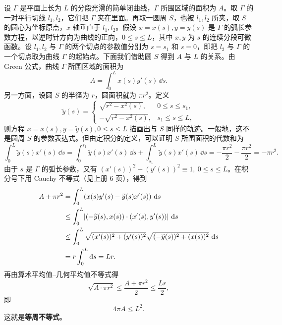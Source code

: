设 $\Gamma$ 是平面上长为 $L$ 的分段光滑的简单闭曲线，$\Gamma$ 所围区域的面积为 $A$。取 $\Gamma$ 的一对平行切线 $l_1,l_2$，它们把 $\Gamma$ 夹在里面。再取一圆周 $S$，也被 $l_1,l_2$ 所夹，取 $S$ 的圆心为坐标原点，$x$ 轴垂直于 $l_1,l_2$。假设 $x=x(s),y=y(s)$ 是 $\Gamma$ 的弧长参数方程，以逆时针方向为曲线的正向，$0\le s\le L$，其中 $x,y$ 为 $s$ 的连续分段可微函数。设 $l_1,l_2$ 与 $\Gamma$ 的两个切点的参数值分别为 $s=s_1$ 和 $s=0$，即把 $l_2$ 与 $\Gamma$ 的一个切点取为曲线 $\Gamma$ 的起始点。下面我们借助圆 $S$ 得到 $A$ 与 $L$ 的关系。由 Green 公式，曲线 $\Gamma$ 所围区域的面积为
\[
  A=\int_0^Lx(s)y'(s)\,\dd s.
\]
另一方面，设圆 $S$ 的半径为 $r$，圆面积就为 $\pi r^2$。定义
\[
  \widetilde y(s)=
  \begin{cases}
    \sqrt{r^2-x^2(s)},&0\le s\le s_1,\\
    -\sqrt{r^2-x^2(s)},&s_1\le s\le L,
  \end{cases}
\]
则方程 $x=x(s),y=\widetilde y(s),0\le s\le L$ 描画出与 $S$ 同样的轨迹。一般地，这不是圆周 $S$ 的参数表达式。但由定积分的定义，可以证明 $S$ 所围面积的代数和为
\[
  \int_0^L\widetilde y(s)x'(s)\,\dd s
  =\int_0^{s_1}\widetilde y(s)x'(s)\,\dd s+\int_{s_1}^L\widetilde y(s)x'(s)\,\dd s
  =-\frac{\pi r^2}{2}-\frac{\pi r^2}{2}=-\pi r^2.
\]
由于 $s$ 是 $\Gamma$ 的弧长参数，又有 $(x'(s))^2+(y'(s))^2\equiv1,\ 0\le s\le L$。在积分号下用 Cauchy 不等式（见上册 6 页），得到
\begin{align*}
  A+\pi r^2
  &=\int_0^L(x(s)y'(s)-\widetilde y(s)x'(s))\,\mathop{}\!\mathrm{d} s\\
  &\le\int_0^L\lvert(-\widetilde y(s),x(s))\cdot(x'(s),y'(s))\rvert\,\mathop{}\!\mathrm{d} s\\
  &\le\int_0^L\sqrt{(x'(s))^2+(y'(s))^2}\sqrt{(-\widetilde y(s))^2+(x(s))^2}\,\mathop{}\!\mathrm{d} s\\
  &=r\int_0^L\mathop{}\!\mathrm{d} s=Lr.
\end{align*}
再由算术平均值--几何平均值不等式得
\[
  \sqrt{A\cdot\pi r^2}\le\frac{A+\pi r^2}{2}\le\frac{Lr}{2},
\]
即
\[
  4\pi A\le L^2.
\]
这就是\textbf{等周不等式}。

